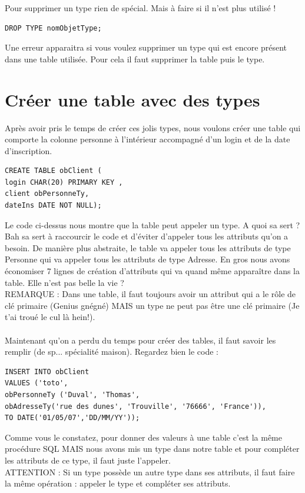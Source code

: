 \documentclass{report}
\begin{document}
Pour supprimer un type rien de spécial. Mais à faire si il n'est plus utilisé !
\begin{lstlisting}[style=MySQLStyle]
DROP TYPE nomObjetType;
\end{lstlisting}
Une erreur apparaitra si vous voulez supprimer un type qui est encore présent dans une table utilisée. Pour cela il faut supprimer la table puis le type.

\section{Créer une table avec des types}
Après avoir pris le temps de créer ces jolis types, nous voulons créer une table qui comporte la colonne personne à l'intérieur accompagné d'un login et de la date d'inscription.
\begin{lstlisting}[style=MySQLStyle]
CREATE TABLE obClient (
login CHAR(20) PRIMARY KEY ,
client obPersonneTy,
dateIns DATE NOT NULL);
\end{lstlisting}
Le code ci-dessus nous montre que la table peut appeler un type. A quoi sa sert ? Bah sa sert à raccourcir le code et d'éviter d'appeler tous les attributs qu'on a besoin. De manière plus abstraite, le table va appeler tous les attributs de type Personne qui va appeler tous les attributs de type Adresse. En gros nous avons économiser 7 lignes de création d'attributs qui va quand même apparaître dans la table. Elle n'est pas belle la vie ? \\
REMARQUE : Dans une table, il faut toujours avoir un attribut qui a le rôle de clé primaire (Genius gnégné) MAIS un type ne peut pas être une clé primaire (Je t'ai troué le cul là hein!).\\ \\
Maintenant qu'on a perdu du temps pour créer des tables, il faut savoir les remplir (de sp... spécialité maison). Regardez bien le code :
\begin{lstlisting}[style=MySQLStyle]
INSERT INTO obClient
VALUES ('toto',
obPersonneTy ('Duval', 'Thomas',
obAdresseTy('rue des dunes', 'Trouville', '76666', 'France')),
TO DATE('01/05/07','DD/MM/YY'));
\end{lstlisting}
Comme vous le constatez, pour donner des valeurs à une table c'est la même procédure SQL MAIS nous avons mis un type dans notre table et pour compléter les attributs de ce type, il faut juste l'appeler.\\
ATTENTION : Si un type possède un autre type dans ses attributs, il faut faire la même opération : appeler le type et compléter ses attributs. \\\\
\end{document}
